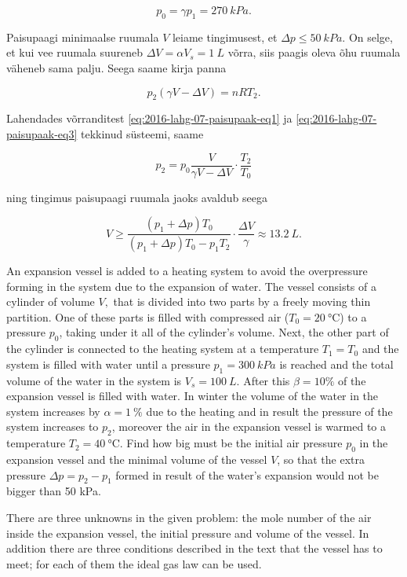 {\[
p_{0}=\gamma p_{1}=\SI{270}{kPa}.
\]


\noindent Paisupaagi minimaalse ruumala $V$ leiame tingimusest, et
$\Delta p\leq\SI{50}{kPa}.$ On selge, et kui vee ruumala suureneb
$\Delta V=\alpha V_{s}=\SI{1}{L}$ võrra, siis paagis oleva õhu ruumala
väheneb sama palju. Seega saame kirja panna

\begin{equation}
p_{2}\left(\gamma V-\Delta V\right)=nRT_{2}.\label{eq:2016-lahg-07-paisupaak-eq3}
\end{equation}


\noindent Lahendades võrranditest \eqref{eq:2016-lahg-07-paisupaak-eq1} ja \eqref{eq:2016-lahg-07-paisupaak-eq3}
tekkinud süsteemi, saame

\[
p_{2}=p_{0}\frac{V}{\gamma V-\Delta V}\cdot\frac{T_{2}}{T_{0}}
\]


\noindent ning tingimus paisupaagi ruumala jaoks avaldub seega

\[
V\geq\frac{\left(p_{1}+\Delta p\right)T_{0}}{\left(p_{1}+\Delta p\right)T_{0}-p_{1}T_{2}}\cdot\frac{\Delta V}{\gamma}\approx\SI{13.2}{L}.
\]
\fi


\ifEngStatement
An expansion vessel is added to a heating system to avoid the overpressure forming in the system due to the expansion of water. The vessel consists of a cylinder of volume $V,$ that is divided into two parts by a freely moving thin partition. One of these parts is filled with compressed air ($T_{0}=\SI{20}{\celsius}$) to a pressure $p_{0}$, taking under it all of the cylinder’s volume. Next, the other part of the cylinder is connected to the heating system at a temperature $T_{1}=T_{0}$ and the system is filled with water until a pressure $p_{1}=\SI{300}{kPa}$ is reached and the total volume of the water in the system is $V_{s}=\SI{100}{L}$. After this $\beta=10\%$ of the expansion vessel is filled with water. In winter the volume of the water in the system increases by $\alpha=\SI{1}{\%}$ due to the heating and in result the pressure of the system increases to $p_{2}$, moreover the air in the expansion vessel is warmed to a temperature $T_{2}=\SI{40}{\celsius}$. Find how big must be the initial air pressure $p_{0}$ in the expansion vessel and the minimal volume of the vessel $V$, so that the extra pressure $\Delta p=p_{2}-p_{1}$ formed in result of the water’s expansion would not be bigger than 50 kPa.
\fi


\ifEngHint
There are three unknowns in the given problem: the mole number of the air inside the expansion vessel, the initial pressure and volume of the vessel. In addition there are three conditions described in the text that the vessel has to meet; for each of them the ideal gas law can be used.
\fi


}
